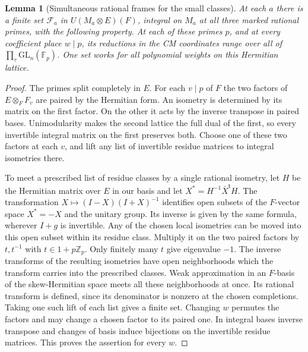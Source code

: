 \documentclass[a4paper,11pt]{article}
\newtheorem{lemma}[proposition]{Lemma}
\theoremstyle{definition}
\theoremstyle{remark}
\numberwithin{equation}{section}
\begin{document}
\begin{lemma}[Simultaneous rational frames for the small classes]\leavevmode
\label{lem:rationalframes446}
At each \(a\) there is a finite set \(\mathcal F_a\) in
\(U(M_a\otimes E)(F)\), integral on \(M_a\) at all three marked
rational primes, with the following property. At each of these primes
\(p\), and at every coefficient place \(w\mid p\), its reductions in
the CM coordinates range over all of
\(\prod_{\tau}\mathrm{GL}_n(\mathbb F_p)\). One set works for all
polynomial weights on this Hermitian lattice.
\end{lemma}
\begin{proof}
The primes split completely in \(E\). For each \(v\mid p\) of \(F\)
the two factors of \(E\otimes_F F_v\) are paired by the Hermitian
form. An isometry is determined by its matrix on the first factor.
On the other it acts by the inverse transpose in paired bases.
Unimodularity makes the second lattice the full dual of the first,
so every invertible integral matrix on the first preserves both.
Choose one of these two factors at each \(v\), and lift any list
of invertible residue matrices to integral isometries there.

To meet a prescribed list of residue classes by a single rational
isometry, let \(H\) be the Hermitian matrix over \(E\) in our basis
and let \(X^\ast=H^{-1}\bar X^{\mathsf t}H\).
The transformation \(X\mapsto(I-X)(I+X)^{-1}\) identifies open
subsets of the \(F\)-vector space \(X^\ast=-X\) and the unitary
group. Its inverse is given by the same formula, wherever \(I+g\)
is invertible. Any of the chosen local isometries can be moved into
this open subset within its residue class. Multiply it on the
two paired factors by \(t,t^{-1}\) with \(t\in 1+p\mathbb Z_p\).
Only finitely many \(t\) give eigenvalue \(-1\). The inverse
transforms of the resulting isometries have open neighborhoods
which the transform carries into the prescribed classes. Weak
approximation in an \(F\)-basis of the skew-Hermitian space meets
all these neighborhoods at once. Its rational transform is defined,
since its denominator is nonzero at the chosen completions.
Taking one such lift of each list gives a finite set. Changing \(w\)
permutes the factors and may change a chosen factor to its paired
one. In integral bases inverse transpose and changes of basis induce
bijections on the invertible residue matrices. This proves the
assertion for every \(w\).
\end{proof}
\end{document}
